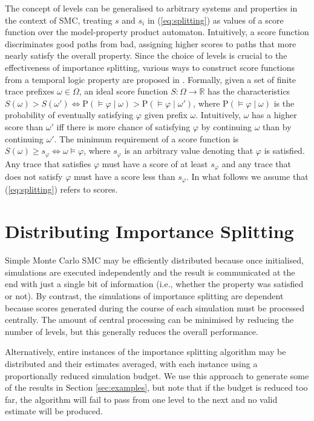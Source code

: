 \documentclass{llncs}
\begin{document}
The concept of levels can be generalised to arbitrary systems and
properties in the context of SMC, treating $s$ and $s_{i}$ in (\ref{eq:splitting})
as values of a score function over the model-property product automaton.
Intuitively, a score function discriminates good paths from bad, assigning
higher scores to paths that more nearly satisfy the overall property.
Since the choice of levels is crucial to the effectiveness of importance
splitting, various ways to construct score functions from a temporal
logic property are proposed in \cite{JegourelLegaySedwards2013}.
Formally, given a set of finite trace prefixes $\omega\in\Omega$,
an ideal score function $S:\Omega\rightarrow\mathbb{R}$ has the characteristics
$S(\omega)>S(\omega')\iff\mathrm{P}(\models\varphi\mid\omega)>\mathrm{P}(\models\varphi\mid\omega')$,
where $\mathrm{P}(\models\varphi\mid\omega)$ is the probability of
eventually satisfying $\varphi$ given prefix $\omega$. Intuitively,
$\omega$ has a higher score than $\omega'$ iff there is more chance
of satisfying $\varphi$ by continuing $\omega$ than by continuing
$\omega'$. The minimum requirement of a score function is $S(\omega)\geq s_{\varphi}\iff\omega\models\varphi$,
where $s_{\varphi}$ is an arbitrary value denoting that $\varphi$
is satisfied. Any trace that satisfies $\varphi$ must have a score
of at least $s_{\varphi}$ and any trace that does not satisfy $\varphi$
must have a score less than $s_{\varphi}$. In what follows we assume
that (\ref{eq:splitting}) refers to scores.


\section{Distributing Importance Splitting}

Simple Monte Carlo SMC may be efficiently distributed because once
initialised, simulations are executed independently and the result
is communicated at the end with just a single bit of information (i.e.,
whether the property was satisfied or not). By contrast, the simulations
of importance splitting are dependent because scores generated during
the course of each simulation must be processed centrally. The amount
of central processing can be minimised by reducing the number of levels,
but this generally reduces the overall performance.

Alternatively, entire instances of the importance splitting algorithm
may be distributed and their estimates averaged, with each instance
using a proportionally reduced simulation budget. We use this approach
to generate some of the results in Section \ref{sec:examples}, but
note that if the budget is reduced too far, the algorithm will fail
to pass from one level to the next and no valid estimate will be produced. 
\end{document}
